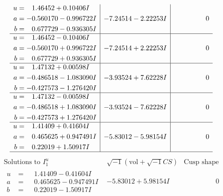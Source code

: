 \documentclass[1p]{elsarticle_modified}
\theoremstyle{definition}
\newcommand{\I}{\sqrt{-1}}
\begin{document}
$$\begin{array}{c|c|c}
\begin{aligned}
u &= \phantom{-}1.46452 + 0.10406 I \\
a &= -0.560170 - 0.996722 I \\
b &= \phantom{-}0.677729 - 0.936305 I\end{aligned}
 & -7.24514 - 2.22253 I & \phantom{-0.000000 } 0 \\ \hline\begin{aligned}
u &= \phantom{-}1.46452 - 0.10406 I \\
a &= -0.560170 + 0.996722 I \\
b &= \phantom{-}0.677729 + 0.936305 I\end{aligned}
 & -7.24514 + 2.22253 I & \phantom{-0.000000 } 0 \\ \hline\begin{aligned}
u &= \phantom{-}1.47132 + 0.00598 I \\
a &= -0.486518 - 1.083090 I \\
b &= -0.427573 - 1.276420 I\end{aligned}
 & -3.93524 + 7.62228 I & \phantom{-0.000000 } 0 \\ \hline\begin{aligned}
u &= \phantom{-}1.47132 - 0.00598 I \\
a &= -0.486518 + 1.083090 I \\
b &= -0.427573 + 1.276420 I\end{aligned}
 & -3.93524 - 7.62228 I & \phantom{-0.000000 } 0 \\ \hline\begin{aligned}
u &= \phantom{-}1.41409 + 0.41604 I \\
a &= \phantom{-}0.465625 + 0.947491 I \\
b &= \phantom{-}0.22019 + 1.50917 I\end{aligned}
 & -5.83012 - 5.98154 I & \phantom{-0.000000 } 0\\
 \hline 
 \end{array}$$\newpage$$\begin{array}{c|c|c}  
\text{Solutions to }I^u_{1}& \I (\text{vol} + \sqrt{-1}CS) & \text{Cusp shape}\\
 \hline 
\begin{aligned}
u &= \phantom{-}1.41409 - 0.41604 I \\
a &= \phantom{-}0.465625 - 0.947491 I \\
b &= \phantom{-}0.22019 - 1.50917 I\end{aligned}
 & -5.83012 + 5.98154 I & \phantom{-0.000000 } 0 \\ \hline\begin{aligned}

\end{aligned}
\end{array}$$
\end{document}
